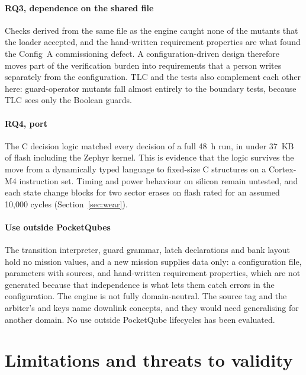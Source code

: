 \documentclass[preprint,12pt]{elsarticle}
\newcommand{\cfgA}{Config~A}
\begin{document}
\paragraph{RQ3, dependence on the shared file} Checks derived from the same file as the engine caught none of the mutants that the loader accepted, and the hand-written requirement properties are what found the \cfgA{} commissioning defect. A configuration-driven design therefore moves part of the verification burden into requirements that a person writes separately from the configuration. TLC and the tests also complement each other here: guard-operator mutants fall almost entirely to the boundary tests, because TLC sees only the Boolean guards.

\paragraph{RQ4, port} The C decision logic matched every decision of a full 48~h run, in under 37~KB of flash including the Zephyr kernel. This is evidence that the logic survives the move from a dynamically typed language to fixed-size C structures on a Cortex-M4 instruction set. Timing and power behaviour on silicon remain untested, and each state change blocks for two sector erases on flash rated for an assumed 10,000 cycles (Section~\ref{sec:wear}).

\paragraph{Use outside PocketQubes} The transition interpreter, guard grammar, latch declarations and bank layout hold no mission values, and a new mission supplies data only: a configuration file, parameters with sources, and hand-written requirement properties, which are not generated because that independence is what lets them catch errors in the configuration. The engine is not fully domain-neutral. The  source tag and the arbiter's  and  keys name downlink concepts, and they would need generalising for another domain. No use outside PocketQube lifecycles has been evaluated.

\section{Limitations and threats to validity}\label{sec:limitations}
\end{document}
